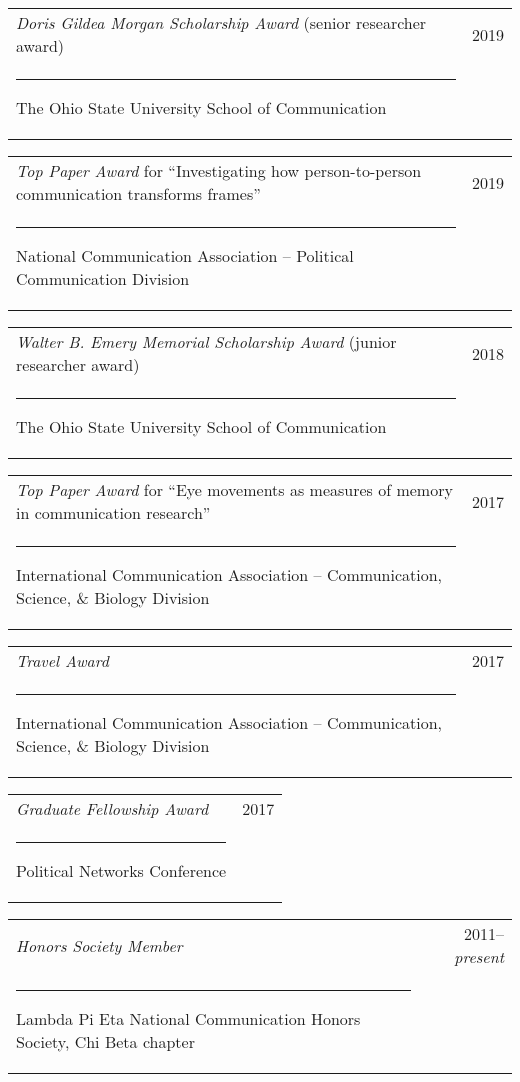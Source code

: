 \documentclass[letterpaper, 10pt]{extarticle}
\begin{document}
\vspace{0.5em}
\begin{tabularx}{\textwidth}{Xr}
\textit{Doris Gildea Morgan Scholarship Award} (senior researcher award) & 2019\\
\rule{0.75em}{0pt}The Ohio State University School of Communication
\end{tabularx}

\vspace{0.5em}
\begin{tabularx}{\textwidth}{Xr}
\textit{Top Paper Award} for ``Investigating how person-to-person communication transforms frames'' & 2019\\
\rule{0.75em}{0pt}National Communication Association -- Political Communication Division
\end{tabularx}

\vspace{0.5em}
\begin{tabularx}{\textwidth}{Xr}
\textit{Walter B. Emery Memorial Scholarship Award} (junior researcher award) & 2018\\
\rule{0.75em}{0pt}The Ohio State University School of Communication
\end{tabularx}

\vspace{0.5em}
\begin{tabularx}{\textwidth}{Xr}
\textit{Top Paper Award} for ``Eye movements as measures of memory in communication research'' & 2017\\
\rule{0.75em}{0pt}International Communication Association -- Communication, Science, \& Biology Division
\end{tabularx}

\vspace{0.5em}
\begin{tabularx}{\textwidth}{Xr}
\textit{Travel Award} & 2017\\
\rule{0.75em}{0pt}International Communication Association -- Communication, Science, \& Biology Division
\end{tabularx}

\vspace{0.5em}
\begin{tabularx}{\textwidth}{Xr}
\textit{Graduate Fellowship Award} & 2017\\
\rule{0.75em}{0pt}Political Networks Conference
\end{tabularx}

\vspace{0.5em}
\begin{tabularx}{\textwidth}{Xr}
\textit{Honors Society Member} & 2011--\textit{present}\\
\rule{0.75em}{0pt}Lambda Pi Eta National Communication Honors Society, Chi Beta chapter
\end{tabularx}
\end{document}
